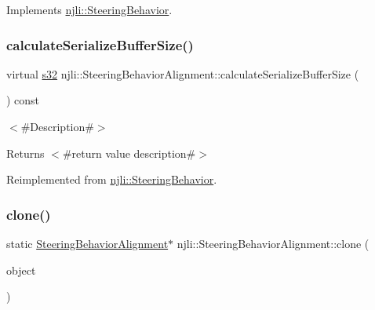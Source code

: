 Implements \mbox{\hyperlink{classnjli_1_1_steering_behavior_a9720953de1268f658636213946d76ed3}{njli\+::\+Steering\+Behavior}}.

\mbox{\label{classnjli_1_1_steering_behavior_alignment_a2b500b0c7cdd4c9bdecb94897749e5bd}} 
\subsubsection{\texorpdfstring{calculate\+Serialize\+Buffer\+Size()}{calculateSerializeBufferSize()}}
{\footnotesize\ttfamily virtual \mbox{\hyperlink{_util_8h_aa62c75d314a0d1f37f79c4b73b2292e2}{s32}} njli\+::\+Steering\+Behavior\+Alignment\+::calculate\+Serialize\+Buffer\+Size (\begin{DoxyParamCaption}{ }\end{DoxyParamCaption}) const\hspace{0.3cm}{\ttfamily [virtual]}}

$<$\#\+Description\#$>$

\begin{DoxyReturn}{Returns}
$<$\#return value description\#$>$ 
\end{DoxyReturn}


Reimplemented from \mbox{\hyperlink{classnjli_1_1_steering_behavior_abbc461d853c1b225cfde5b79d96d11bd}{njli\+::\+Steering\+Behavior}}.

\mbox{\label{classnjli_1_1_steering_behavior_alignment_a1a8619aea2138978c70770837344f2b3}} 
\subsubsection{\texorpdfstring{clone()}{clone()}}
{\footnotesize\ttfamily static \mbox{\hyperlink{classnjli_1_1_steering_behavior_alignment}{Steering\+Behavior\+Alignment}}$\ast$ njli\+::\+Steering\+Behavior\+Alignment\+::clone (\begin{DoxyParamCaption}\item[{const \mbox{\hyperlink{classnjli_1_1_steering_behavior_alignment}{Steering\+Behavior\+Alignment}} \&}]{object }\end{DoxyParamCaption})\hspace{0.3cm}{\ttfamily [static]}}



